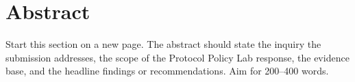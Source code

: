 
\section{Abstract}

\begin{instructional}
Start this section on a new page. The abstract should state the inquiry the submission addresses, the scope of the Protocol Policy Lab response, the evidence base, and the headline findings or recommendations. Aim for 200--400 words.
\end{instructional}
